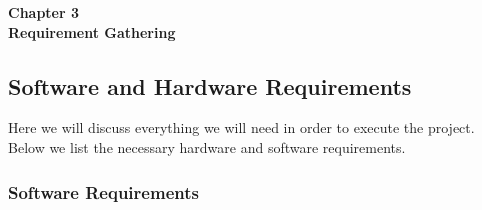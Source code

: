 \documentclass[12pt]{article}
\begin{document}
\onehalfspacing   %

\vspace*{\fill}
\begin{center}
    {\Large \bf Chapter 3} \\[2em]
    {\Large \bf Requirement Gathering}
\end{center}
\vspace*{\fill}

\newpage

\vspace{15pt}

\setcounter{section}{3}

\subsection{Software and Hardware Requirements}

\vspace{5pt}

\noindent Here we will discuss everything we will need in order to execute the project. Below we list the necessary hardware and software requirements. 

\vspace{10pt}

\subsubsection{Software Requirements}
\end{document}
